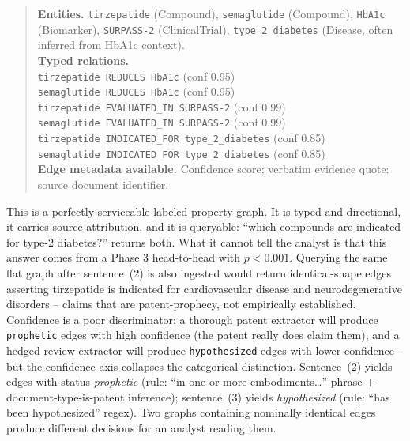 \begin{quote}\small
\textbf{Entities.} \texttt{tirzepatide} (Compound), \texttt{semaglutide} (Compound), \texttt{HbA1c} (Biomarker), \texttt{SURPASS-2} (ClinicalTrial), \texttt{type 2 diabetes} (Disease, often inferred from HbA1c context).\\[2pt]
\textbf{Typed relations.}\\
\hspace*{1em}\texttt{tirzepatide REDUCES HbA1c} \quad (conf 0.95)\\
\hspace*{1em}\texttt{semaglutide REDUCES HbA1c} \quad (conf 0.95)\\
\hspace*{1em}\texttt{tirzepatide EVALUATED\_IN SURPASS-2} \quad (conf 0.99)\\
\hspace*{1em}\texttt{semaglutide EVALUATED\_IN SURPASS-2} \quad (conf 0.99)\\
\hspace*{1em}\texttt{tirzepatide INDICATED\_FOR type\_2\_diabetes} \quad (conf 0.85)\\
\hspace*{1em}\texttt{semaglutide INDICATED\_FOR type\_2\_diabetes} \quad (conf 0.85)\\[2pt]
\textbf{Edge metadata available.} Confidence score; verbatim evidence quote; source document identifier.
\end{quote}

This is a perfectly serviceable labeled property graph. It is typed and directional, it carries source attribution, and it is queryable: ``which compounds are indicated for type-2 diabetes?'' returns both. What it cannot tell the analyst is that this answer comes from a Phase 3 head-to-head with $p<0.001$. Querying the same flat graph after sentence~(2) is also ingested would return identical-shape edges asserting tirzepatide is indicated for cardiovascular disease and neurodegenerative disorders -- claims that are patent-prophecy, not empirically established. Confidence is a poor discriminator: a thorough patent extractor will produce \texttt{prophetic} edges with high confidence (the patent really does claim them), and a hedged review extractor will produce \texttt{hypothesized} edges with lower confidence -- but the confidence axis collapses the categorical distinction. Sentence~(2) yields edges with status \emph{prophetic} (rule: ``in one or more embodiments\ldots'' phrase + document-type-is-patent inference); sentence~(3) yields \emph{hypothesized} (rule: ``has been hypothesized'' regex). Two graphs containing nominally identical edges produce different decisions for an analyst reading them.

